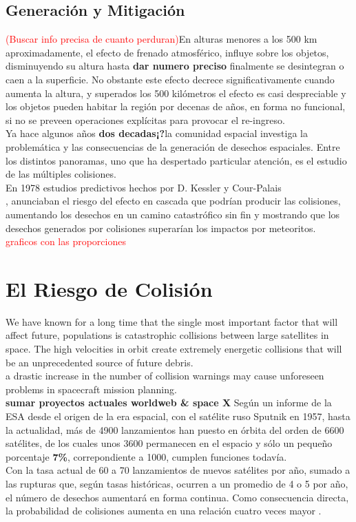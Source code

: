 {\subsection{Generaci\'on y Mitigaci\'on}
\textcolor{red}{(Buscar info precisa de cuanto perduran)}En alturas menores a los 500 km aproximadamente, el efecto de frenado atmosf\'erico, influye sobre los objetos, disminuyendo su altura hasta {\bf{dar numero preciso}} finalmente se desintegran o caen a la superficie. No obstante este efecto decrece significativamente cuando aumenta la altura, y superados los 500 kil\'ometros el efecto es casi despreciable y los objetos pueden habitar la regi\'on por decenas de a\~nos, en forma no funcional, si no se preveen operaciones expl\'icitas para provocar el re-ingreso.\\ 

Ya hace algunos a\~nos {\bf{dos decadas¡?}}la comunidad espacial investiga la problem\'atica y las consecuencias de la generaci\'on de desechos espaciales. Entre los distintos panoramas, uno que ha despertado particular atenci\'on, es el estudio de las m\'ultiples colisiones.\\
En 1978  estudios predictivos hechos por D. Kessler y Cour-Palais\\
 \cite{kessler0}, anunciaban el riesgo del efecto en cascada que podr\'ian producir las colisiones, aumentando los desechos en un camino catastr\'ofico sin fin y mostrando que los desechos generados por colisiones superar\'ian los impactos por meteoritos.\\
\textcolor{red}{graficos con las proporciones}

\section{El Riesgo de Colisi\'on}

We have known for a long time that the single most important factor that will affect future, 
populations is catastrophic collisions between large satellites in space.  The high velocities in orbit create extremely energetic collisions that will be an unprecedented source of future debris.\\
 a drastic increase in the number of collision warnings may cause unforeseen problems in spacecraft mission planning.\\
{\bf{sumar proyectos actuales worldweb \& space X}}
Seg\'un un informe de la \ac{ESA} desde el origen de la era espacial, con el sat\'elite ruso Sputnik en 1957, hasta la actualidad, m\'as de 4900 lanzamientos han puesto en \'orbita del orden de 6600 sat\'elites, de los cuales unos 3600 permanecen en el espacio y s\'olo un peque\~no porcentaje {\bf{7\%}}, correpondiente a 1000, cumplen funciones todav\'ia.\\
Con la tasa actual de 60 a 70 lanzamientos de nuevos sat\'elites por a\~no, sumado a las rupturas que, seg\'un tasas hist\'oricas, ocurren a un promedio de 4 o 5 por a\~no, el n\'umero de desechos aumentar\'a en forma continua. Como consecuencia directa, la probabilidad de colisiones aumenta en una relaci\'on cuatro veces mayor \cite{esaSD}.\\

}
